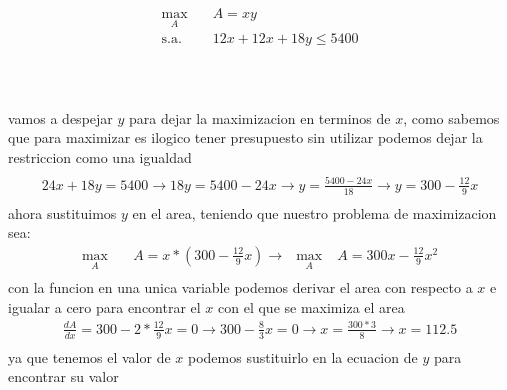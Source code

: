 \documentclass[11pt,a4paper]{article}
\begin{document}
\begin{flushleft}
\begin{minipage}{0.3\textwidth}
\begin{flushright}
        \end{flushright}
    \end{minipage}
    \begin{minipage}{0.65\textwidth}
        \begin{equation*}
            \begin{aligned}
                \max_{A} & \quad A = xy \\
                \text{s.a.} & \quad 12x+12x+18y \leq 5400 \\
            \end{aligned}
        \end{equation*}
    \end{minipage}
\\~\\
    vamos a despejar $y$ para dejar la maximizacion en terminos de $x$, 
    como sabemos que para maximizar es ilogico tener presupuesto sin utilizar
    podemos dejar la restriccion como una igualdad
    \begin{equation*}
        \begin{aligned}
            \\
            24x+18y = 5400 \to 18y = 5400-24x \to y = \frac{5400-24x}{18} \to y = 300 - \frac{12}{9}x \\
        \end{aligned}
    \end{equation*}
    ahora sustituimos $y$ en el area, teniendo que nuestro problema de maximizacion sea:
    \begin{equation*}
        \begin{aligned}
            \max_{A} & \quad A = x*\left( 300 - \frac{12}{9}x \right) \to ~~ \max_{A} &  A = 300x-\frac{12}{9}x^2 \\
        \end{aligned}
    \end{equation*}
    con la funcion en una unica variable podemos derivar el area con respecto a $x$ e igualar a cero para encontrar el $x$ con el que se maximiza el area
    \begin{equation*}
        \begin{aligned}
            \frac{dA}{dx} = 300 - 2*\frac{12}{9}x = 0 \to 300 - \frac{8}{3}x = 0 \to x = \frac{300*3}{8} \to x = 112.5 \\
        \end{aligned}
    \end{equation*}
    ya que tenemos el valor de $x$ podemos sustituirlo en la ecuacion de $y$ para encontrar su valor

\end{flushleft}
\end{document}
